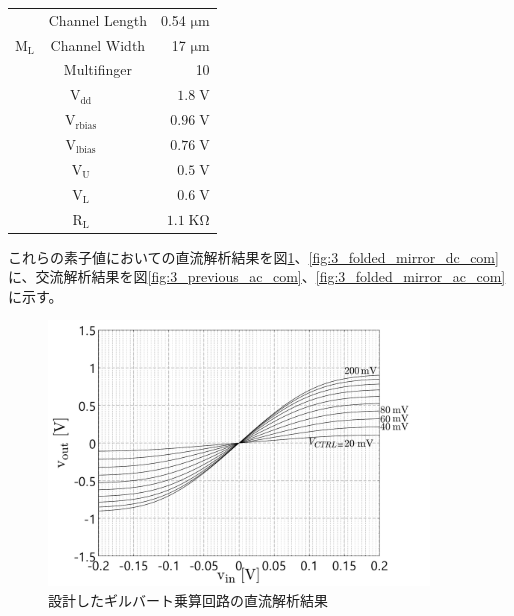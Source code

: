 \begin{table}[!b]
\begin{tabular}{c|c|r}
                    &   Channel Length   &   0.54 $\mathrm{\mu m}$   \\
                    \cline{2-3}
                    $\mathrm{M_{L}}$   &   Channel Width   &   17 $\mathrm{\mu m}$   \\
                    \cline{2-3}
                        &   Multifinger   & 10    \\
                    \hline
                    \multicolumn{2}{c|}{$\mathrm{V_{dd}}$} &   $1.8\;\mathrm{V}$   \\
                    \hline
                    \multicolumn{2}{c|}{$\mathrm{V_{rbias}}$} &   $0.96\;\mathrm{V}$   \\
                    \hline
                    \multicolumn{2}{c|}{$\mathrm{V_{lbias}}$} &   $0.76\;\mathrm{V}$   \\
                    \hline
                    \multicolumn{2}{c|}{$\mathrm{V_{U}}$} &   $0.5\;\mathrm{V}$   \\
                    \hline
                    \multicolumn{2}{c|}{$\mathrm{V_{L}}$} &   $0.6\;\mathrm{V}$   \\
                    \hline
                    \multicolumn{2}{c|}{$\mathrm{R_{L}}$} &   $1.1\;\mathrm{K \Omega}$   \\
                    \hline
            \end{tabular}
        \end{table}
        これらの素子値においての直流解析結果を図\ref{fig:3_previous_dc_com}、\ref{fig:3_folded_mirror_dc_com}に、交流解析結果を図\ref{fig:3_previous_ac_com}、\ref{fig:3_folded_mirror_ac_com}に示す。
        \begin{figure}[!b]
            \centering
            \includegraphics[width=0.9\textwidth]{figures/chapter3/previous_dc_com.pdf}
            \caption{設計したギルバート乗算回路の直流解析結果}
            \label{fig:3_previous_dc_com}
        \end{figure}
